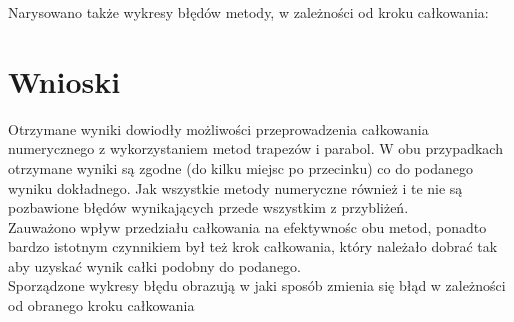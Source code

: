 \documentclass{article}
\begin{document}
Narysowano także wykresy błędów metody, w zależności od kroku całkowania:
	\section{Wnioski}
	Otrzymane wyniki dowiodły możliwości przeprowadzenia całkowania numerycznego z wykorzystaniem metod trapezów i parabol. W obu przypadkach otrzymane wyniki są zgodne (do kilku miejsc po przecinku) co do podanego wyniku dokładnego. Jak wszystkie metody numeryczne również i te nie są pozbawione błędów wynikających przede wszystkim z przybliżeń.\\
	Zauważono wpływ przedziału całkowania na efektywnośc obu metod, ponadto bardzo istotnym czynnikiem był też krok całkowania, który należało dobrać tak aby uzyskać wynik całki podobny do podanego.\\
	Sporządzone wykresy błędu  obrazują w jaki sposób zmienia się błąd w zależności od obranego kroku całkowania\\
\end{document}
